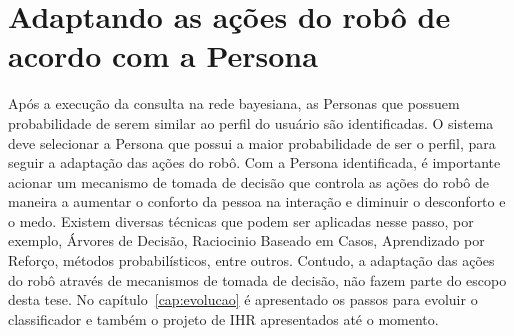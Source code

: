 \section{Adaptando as ações do robô de acordo com a Persona}
\label{sec:classificapersona}
Após a execução da consulta na rede bayesiana, as Personas que possuem probabilidade de serem similar ao perfil do usuário são identificadas. O sistema deve selecionar a Persona que possui a maior probabilidade de ser o perfil, para seguir a adaptação das ações do robô. Com a Persona identificada, é importante acionar um mecanismo de tomada de decisão que controla as ações do robô de maneira a aumentar o conforto da pessoa na interação e diminuir o desconforto e o medo. Existem diversas técnicas que podem ser aplicadas nesse passo, por exemplo, Árvores de Decisão, Raciocinio Baseado em Casos, Aprendizado por Reforço, métodos probabilísticos, entre outros. Contudo, a adaptação das ações do robô através de mecanismos de tomada de decisão, não fazem parte do escopo desta tese. No capítulo~\ref{cap:evolucao} é apresentado os passos para evoluir o classificador e também o projeto de IHR apresentados até o momento.

